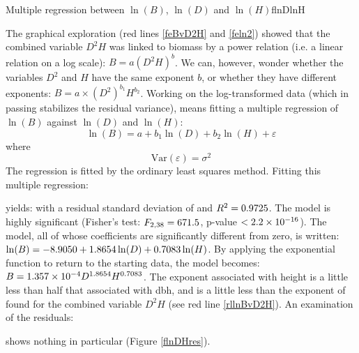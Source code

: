 \begin{filrouge}{Multiple regression between $\ln(B)$, $\ln(D)$ and $\ln(H)$}{flnDlnH}%

The graphical exploration (red lines \ref{feBvD2H} and \ref{feln2}) showed that the combined variable $D^2H$ was linked to biomass by a power relation (i.e. a linear relation on a log scale): $B=a(D^2H)^b$. We can, however, wonder whether the variables $D^2$ and $H$ have the same exponent $b$, or whether they have different exponents: $B=a\times(D^2)^{b_1}H^{b_2}$. Working on the log-transformed data (which in passing stabilizes the residual variance), means fitting a multiple regression of $\ln(B)$ against $\ln(D)$ and $\ln(H)$:
\[
\ln(B)=a+b_1\ln(D)+b_2\ln(H)+\varepsilon
\]
where
\[
\mathrm{Var}(\varepsilon)=\sigma^2
\]
The regression is fitted by the ordinary least squares method. Fitting this multiple regression:

%
yields:
%
with a residual standard deviation of   and $R^2=\mbox{0.9725}$. 
The model is highly significant (Fisher's test: $F_{2,38}=\mbox{671.5}$, p-value $<\mbox{2.2}\times10^{-16}$). The model, all of whose coefficients are significantly different from zero, is written: $\ln(B)=-\mbox{8.9050}+\mbox{1.8654}\ln(D)+\mbox{0.7083}\ln(H)$. By applying the exponential function to return to the starting data, the model becomes: $B=\mbox{1.357}\times10^{-4}D^{1.8654}H^{0.7083}$. The exponent associated with height is a little less than half that associated with dbh, and is a little less than the exponent of  found for the combined variable $D^2H$ (see red line \ref{rllnBvD2H}). An examination of the residuals:

%
shows nothing in particular (Figure \ref{flnDHres}).
\end{filrouge}

